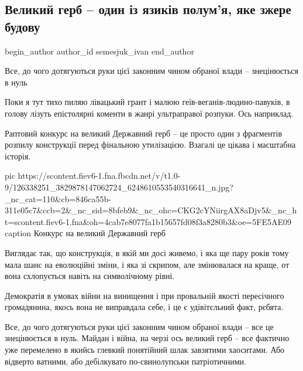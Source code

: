  
 
 
 
 
\subsection{Великий герб – один із язиків полум'я, яке зжере будову}
\ifcmt
	begin_author
   author_id semesjuk_ivan
	end_author
\fi

\begin{center}
  \begin{fminipage}{0.7\textwidth}
		\color{yellow}
		Все, до чого дотягуються руки цієї законним чином обраної влади – знецінюється в нуль
  \end{fminipage}
\end{center}
  
Поки я тут тихо пиляю лівацький грант і малюю геїв-веганів-людино-павуків, в
голову лізуть епістолярні коменти в жанрі ультраправої розпуки. Ось наприклад.

Раптовий конкурс на великий Державний герб – це просто один з фрагментів
розпилу конструкції перед фінальною утилізацією. Взагалі це цікава і масштабна
історія.

\ifcmt
pic https://scontent.fiev6-1.fna.fbcdn.net/v/t1.0-9/126338251_3829878147062724_6248610553540316641_n.jpg?_nc_cat=110&cb=846ca55b-311e05c7&ccb=2&_nc_sid=8bfeb9&_nc_ohc=CKG2cYNiirgAX8aDjv5&_nc_ht=scontent.fiev6-1.fna&oh=4cab7e8077fa1b15657fd08f3a8280b3&oe=5FE5AE09
caption Конкурс на великий Державний герб
\fi

Виглядає так, що конструкція, в якій ми досі живемо, і яка ще пару років тому
мала шанс на еволюційні зміни, і яка зі скрипом, але змінювалася на краще, от
вона схлопується навіть на символічному рівні.

Демократія в умовах війни на винищення і при провальній якості пересічного
громадянина, якось вона не виправдала себе, і це є удівітєльний факт, рєбята.

Все, до чого дотягуються руки цієї законним чином обраної влади – все це
знецінюється в нуль. Майдан і війна, на черзі ось великий герб – все фактично
уже перемелено в якийсь глевкий понятійний шлак завзятими хаоситами. Або
відверто ватними, або дебілкувато по-свинолупськи патріотичними.

